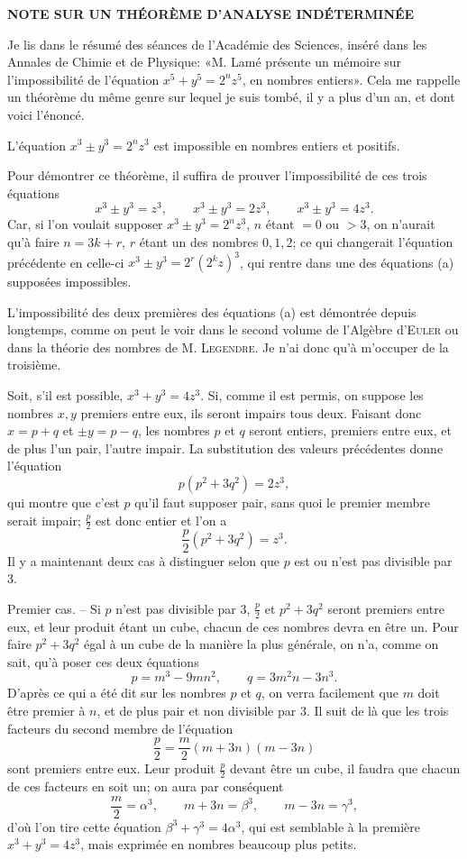 \documentclass[11pt]{article}
\newcommand{\scn}[1]{\textsc{#1}}
\begin{document}
\begin{center}
{\Large\bfseries NOTE SUR UN THÉORÈME D'ANALYSE INDÉTERMINÉE\par}
\vspace{0.8em}
\end{center}

Je lis dans le résumé des séances de l'Académie des Sciences, inséré dans les Annales de Chimie et de Physique: «M. Lamé présente un mémoire sur l'impossibilité de l'équation $x^5+y^5=2^n z^5$, en nombres entiers». Cela me rappelle un théorème du même genre sur lequel je suis tombé, il y a plus d'un an, et dont voici l'énoncé.

L'équation $x^3\pm y^3=2^n z^3$ est impossible en nombres entiers et positifs.

Pour démontrer ce théorème, il suffira de prouver l'impossibilité de ces trois équations
\[
\tag{a}
 x^3\pm y^3=z^3,\qquad x^3\pm y^3=2z^3,\qquad x^3\pm y^3=4z^3.
\]
Car, si l'on voulait supposer $x^3\pm y^3=2^n z^3$, $n$ étant $=0$ ou $>3$, on n'aurait qu'à faire $n=3k+r$, $r$ étant un des nombres $0,1,2$; ce qui changerait l'équation précédente en celle-ci $x^3\pm y^3=2^r(2^kz)^3$, qui rentre dans une des équations (a) supposées impossibles.

L'impossibilité des deux premières des équations (a) est démontrée depuis longtemps, comme on peut le voir dans le second volume de l'Algèbre d'\scn{Euler} ou dans la théorie des nombres de M. \scn{Legendre}. Je n'ai donc qu'à m'occuper de la troisième.

Soit, s'il est possible, $x^3+y^3=4z^3$. Si, comme il est permis, on suppose les nombres $x,y$ premiers entre eux, ils seront impairs tous deux. Faisant donc $x=p+q$ et $\pm y=p-q$, les nombres $p$ et $q$ seront entiers, premiers entre eux, et de plus l'un pair, l'autre impair. La substitution des valeurs précédentes donne l'équation
\[
 p(p^2+3q^2)=2z^3,
\]
qui montre que c'est $p$ qu'il faut supposer pair, sans quoi le premier membre serait impair; $\frac p2$ est donc entier et l'on a
\[
 \frac p2(p^2+3q^2)=z^3.
\]
Il y a maintenant deux cas à distinguer selon que $p$ est ou n'est pas divisible par $3$.

Premier cas. -- Si $p$ n'est pas divisible par $3$, $\frac p2$ et $p^2+3q^2$ seront premiers entre eux, et leur produit étant un cube, chacun de ces nombres devra en être un. Pour faire $p^2+3q^2$ égal à un cube de la manière la plus générale, on n'a, comme on sait, qu'à poser ces deux équations
\[
 p=m^3-9mn^2,\qquad q=3m^2n-3n^3.
\]
D'après ce qui a été dit sur les nombres $p$ et $q$, on verra facilement que $m$ doit être premier à $n$, et de plus pair et non divisible par $3$. Il suit de là que les trois facteurs du second membre de l'équation
\[
 \frac p2=\frac m2(m+3n)(m-3n)
\]
sont premiers entre eux. Leur produit $\frac p2$ devant être un cube, il faudra que chacun de ces facteurs en soit un; on aura par conséquent
\[
 \frac m2=\alpha^3,\qquad m+3n=\beta^3,\qquad m-3n=\gamma^3,
\]
d'où l'on tire cette équation $\beta^3+\gamma^3=4\alpha^3$, qui est semblable à la première $x^3+y^3=4z^3$, mais exprimée en nombres beaucoup plus petits.
\end{document}
